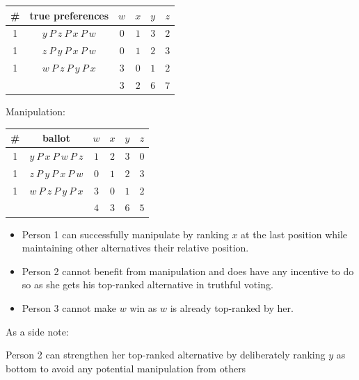 \documentclass[a4paper]{article}
\begin{document}
\begin{table}[!htbp]
    \centering
    \begin{tabular}{c|c|cccc|}
        \# & true preferences             & $w$  & $x$  & $y$  & $z$ \\ 
        \hline
        1  & $y\: P\: z\: P\: x\: P\: w$  & $0$  & $1$  & $3$  & $2$ \\
        1  & $z\: P\: y\: P\: x\: P\: w$  & $0$  & $1$  & $2$  & $3$ \\
        1  & $w\: P\: z\: P\: y\: P\: x$  & $3$  & $0$  & $1$  & $2$ \\
        \hline
           &                              & $3$ & $2$  & $6$  & $7$ \\
        \hline
    \end{tabular}
\end{table}

Manipulation:
\begin{table}[!htbp]
    \centering
    \begin{tabular}{c|c|cccc|}
        \# & ballot                       & $w$  & $x$  & $y$  & $z$ \\ 
        \hline
        1  & $y\: P\: x\: P\: w\: P\: z$  & $1$  & $2$  & $3$  & $0$ \\
        1  & $z\: P\: y\: P\: x\: P\: w$  & $0$  & $1$  & $2$  & $3$ \\
        1  & $w\: P\: z\: P\: y\: P\: x$  & $3$  & $0$  & $1$  & $2$ \\
        \hline
           &                              & $4$ & $3$  & $6$  & $5$ \\
        \hline
    \end{tabular}
\end{table}

\begin{itemize}
    \item Person 1 can successfully manipulate by ranking $x$ at the last position while maintaining other alternatives their relative position.
    \item Person 2 cannot benefit from manipulation and does have any incentive to do so as she gets his top-ranked alternative in truthful voting.
    \item Person 3 cannot make $w$ win as $w$ is already top-ranked by her.
\end{itemize}

As a side note:

Person 2 can strengthen her top-ranked alternative by deliberately ranking $y$ as bottom to avoid any potential manipulation from others
\end{document}
